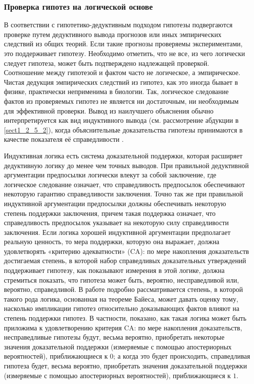 \subsubsection{Проверка гипотез на логической основе}\label{sect1_2_2_3}
В соответствии с гипотетико-дедуктивным подходом гипотезы подвергаются проверке путем дедуктивного вывода прогнозов или 
иных эмпирических следствий из общих теорий. Если такие прогнозы проверяемы экспериментами, это поддерживает гипотезу. 
Необходимо отметить, что не все, из чего логически следует гипотеза, может быть подтверждено надлежащей проверкой. 
Соотношение между гипотезой и фактом часто не логическое, а эмпирическое. Чистая дедукция эмпирических следствий из 
гипотез, как это иногда бывает в физике, практически неприменима в биологии. Так, логическое следование фактов из 
проверяемых гипотез не является ни достаточным, ни необходимым для эффективной проверки. Вывод из наилучшего объяснения 
обычно интерпретируется как вид индуктивного вывода (см. рассмотрение абдукции в \ref{sect1_2_5_2}), когда 
объяснительные доказательства гипотезы принимаются в качестве показателя её справедливости \cite{weber2014}. 

Индуктивная логика есть система доказательной поддержки, которая расширяет дедуктивную логику до менее чем точных 
выводов. При правильной дедуктивной аргументации предпосылки логически влекут за собой заключение, где логическое 
следование означает, что справедливость предпосылок обеспечивают некоторую гарантию справедливости заключения. Точно 
так же при правильной индуктивной аргументации предпосылки должны обеспечивать некоторую степень поддержки заключения, 
причем такая поддержка означает, что справедливость предпосылок указывает на некоторую силу справедливости заключения. 
Если логика хорошей индуктивной аргументации предполагает реальную ценность, то мера поддержки, которую она выражает, 
должна удовлетворять «критерию адекватности» (CA): по мере накопления доказательств достигаемая степень, в которой 
набор справедливых доказательных утверждений поддерживает гипотезу, как показывают измерения в этой логике, должна 
стремиться показать, что гипотеза может быть, вероятно, несправедливой или, вероятно, справедливой. В работе 
\cite{hawthorne2021} подробно рассматривается степень, в которой такого рода логика, основанная на теореме Байеса, 
может давать оценку тому, насколько импликации гипотез относительно доказывающих фактов влияют на степень поддержки 
гипотез. В частности, показано, как такая логика может быть приложима к удовлетворению критерия CA: по мере 
накопления доказательств, несправедливые гипотезы будут, весьма вероятно, приобретать некоторые значения доказательной 
поддержки (измеряемые с помощью апостериорных вероятностей), приближающиеся к $0$; а когда это будет происходить, 
справедливая гипотеза будет, весьма вероятно, приобретать значения доказательной поддержки (измеряемые с помощью 
апостериорных вероятностей), приближающиеся к $1$.


